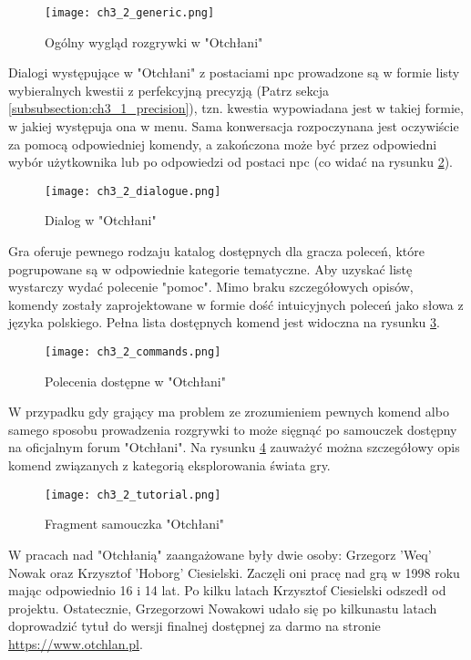 \begin{figure}[h]
    \texttt{[image: ch3\_2\_generic.png]}
    \caption{Ogólny wygląd rozgrywki w "Otchłani"}
    \centering
    \label{fig:ch3_2_generic}
\end{figure}

Dialogi występujące w "Otchłani" z postaciami \gls{npc} prowadzone są w formie listy wybieralnych kwestii
z perfekcyjną precyzją (Patrz sekcja \ref{subsubsection:ch3_1_precision}), tzn. kwestia wypowiadana
jest w takiej formie, w jakiej występuja ona w menu. Sama konwersacja rozpoczynana jest oczywiście
za pomocą odpowiedniej komendy, a zakończona może być przez odpowiedni wybór użytkownika lub po
odpowiedzi od postaci \gls{npc} (co widać na rysunku \ref{fig:ch3_2_dialogue}).

\begin{figure}[h]
    \texttt{[image: ch3\_2\_dialogue.png]}
    \caption{Dialog w "Otchłani"}
    \centering
    \label{fig:ch3_2_dialogue}
\end{figure}

Gra oferuje pewnego rodzaju katalog dostępnych dla gracza poleceń, które pogrupowane są w
odpowiednie kategorie tematyczne. Aby uzyskać listę wystarczy wydać polecenie "pomoc". Mimo braku
szczegółowych opisów, komendy zostały zaprojektowane w formie dość intuicyjnych poleceń jako słowa
z języka polskiego. Pełna lista dostępnych komend jest widoczna na rysunku \ref{fig:ch3_2_commands}.

\begin{figure}[h]
    \texttt{[image: ch3\_2\_commands.png]}
    \caption{Polecenia dostępne w "Otchłani"}
    \centering
    \label{fig:ch3_2_commands}
\end{figure}

W przypadku gdy grający ma problem ze zrozumieniem pewnych komend albo samego sposobu prowadzenia
rozgrywki to może sięgnąć po samouczek dostępny na oficjalnym forum "Otchłani". Na rysunku
\ref{fig:ch3_2_tutorial} zauważyć można szczegółowy opis komend związanych z kategorią
eksplorowania świata gry.

\begin{figure}[h]
    \texttt{[image: ch3\_2\_tutorial.png]}
    \caption{Fragment samouczka "Otchłani"}
    \centering
    \label{fig:ch3_2_tutorial}
\end{figure}

W pracach nad "Otchłanią" zaangażowane były dwie osoby: Grzegorz 'Weq' Nowak oraz Krzysztof 'Hoborg'
Ciesielski. Zaczęli oni pracę nad grą w 1998 roku mając odpowiednio 16 i 14 lat\cite{otchlan_historia}.
Po kilku latach Krzysztof Ciesielski odszedł od projektu. Ostatecznie, Grzegorzowi Nowakowi udało się
po kilkunastu latach doprowadzić tytuł do wersji finalnej dostępnej za darmo na stronie
\href{https://www.otchlan.pl}{https://www.otchlan.pl}.
